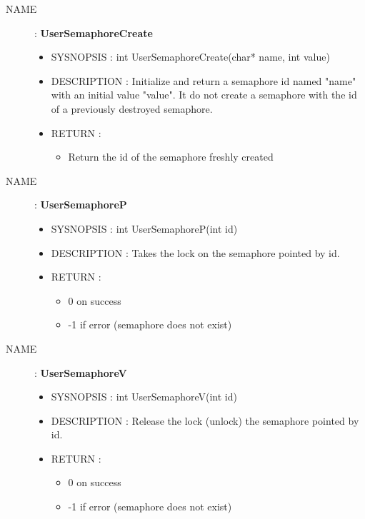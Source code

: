 \documentclass[a4paper,10pt]{article}
\begin{document}
\begin{description}
    \item [NAME] : \textbf{UserSemaphoreCreate}
        \begin{itemize}
            \item SYSNOPSIS : int UserSemaphoreCreate(char* name, int value)
            \item DESCRIPTION :
                Initialize and return a semaphore id named "name" with an initial value "value".
                It do not create a semaphore with the id of a previously destroyed semaphore.
            \item RETURN :
                \begin{itemize}
                    \item Return the id of the semaphore freshly created
                \end{itemize}
        \end{itemize}

    \item [NAME] : \textbf{UserSemaphoreP}
        \begin{itemize}
            \item SYSNOPSIS : int UserSemaphoreP(int id)
            \item DESCRIPTION :
                Takes the lock on the semaphore pointed by id.
            \item RETURN :
                \begin{itemize}
                    \item 0 on success
                    \item -1 if error (semaphore does not exist)
                \end{itemize}
        \end{itemize}

    \item [NAME] : \textbf{UserSemaphoreV}
        \begin{itemize}
            \item SYSNOPSIS : int UserSemaphoreV(int id)
            \item DESCRIPTION :
                Release the lock (unlock) the semaphore pointed by id.
            \item RETURN :
                \begin{itemize}
                    \item 0 on success
                    \item -1 if error (semaphore does not exist)
                \end{itemize}
        \end{itemize}


\end{description}
\end{document}
